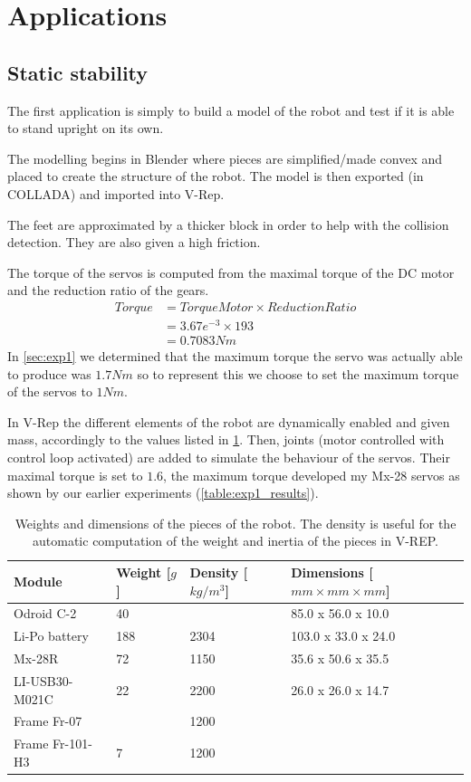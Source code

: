 \section{Applications}
\subsection{Static stability}
The first application is simply to build a model of the robot and test if it is able to stand upright on its own.

The modelling begins in Blender where pieces are simplified/made convex and placed to create the structure of the robot. The model is then exported (in COLLADA) and imported into V-Rep. 

The feet are approximated by a thicker block in order to help with the collision detection. They are also given a high friction.

The torque of the servos is computed from the maximal torque of the DC motor and the reduction ratio of the gears. 
\begin{align*}
Torque &= TorqueMotor \times ReductionRatio\\
&= 3.67e^{-3} \times 193\\
&= 0.7083Nm
\end{align*}
In \cref{sec:exp1} we determined that the maximum torque the servo was actually able to produce was $1.7Nm$ so to represent this we choose to set the maximum torque of the servos to $1Nm$.

In V-Rep the different elements of the robot are dynamically enabled and given mass, accordingly to the values listed in \cref{table:weights}. Then, joints (motor controlled with control loop activated) are added to simulate the behaviour of the servos. Their maximal torque is set to $1.6$, the maximum torque developed my Mx-28 servos as shown by our earlier experiments (\cref{table:exp1_results}). 

\begin{table}[htp]
\center
\begin{tabularx}{\textwidth}{@{} l X X l @{}}
\toprule
\textbf{Module} & \textbf{Weight [$g$]} &  \textbf{Density [$kg/m^3$]}& \textbf{Dimensions [$mm \times mm \times mm$]}\\ 
\midrule
Odroid C-2 & 40 &  & 85.0 x 56.0 x 10.0\\
Li-Po battery & 188 & 2304 & 103.0 x 33.0 x 24.0\\
Mx-28R & 72 & 1150 & 35.6 x 50.6 x 35.5\\
LI-USB30-M021C & 22 & 2200 & 26.0 x 26.0 x 14.7\\
Frame Fr-07 & & 1200 & \\
Frame Fr-101-H3 & 7 & 1200 & \\
\bottomrule
\end{tabularx}
\caption[Weights and dimensions of the pieces of the robot]{Weights and dimensions of the pieces of the robot. The density is useful for the automatic computation of the weight and inertia of the pieces in V-REP.}
\label{table:weights}
\end{table}

